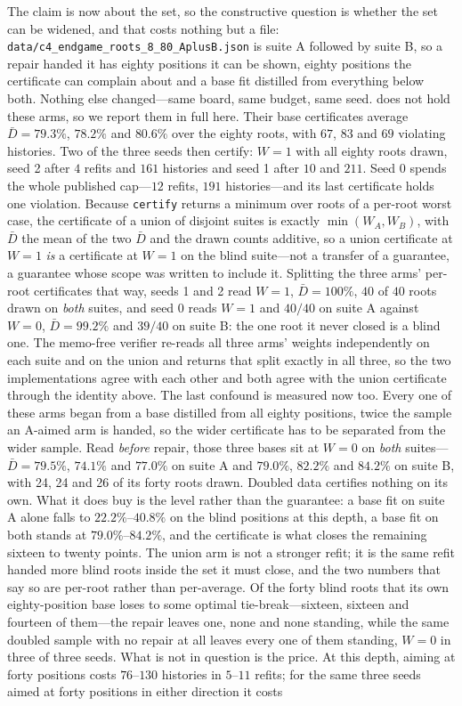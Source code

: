 \documentclass[conference]{IEEEtran}
\begin{document}
The claim is now about the set, so the constructive question is whether the set can be widened, and that costs nothing but a file: \texttt{data/c4\_endgame\_roots\_8\_80\_AplusB.json} is suite A followed by suite B, so a repair handed it has eighty positions it can be shown, eighty positions the certificate can complain about and a base fit distilled from everything below both. Nothing else changed---same board, same budget, same seed.  does not hold these arms, so we report them in full here. Their base certificates average $\bar D=79.3\%$, $78.2\%$ and $80.6\%$ over the eighty roots, with $67$, $83$ and $69$ violating histories. Two of the three seeds then certify: $W=1$ with all eighty roots drawn, seed 2 after $4$ refits and $161$ histories and seed 1 after $10$ and $211$. Seed 0 spends the whole published cap---$12$ refits, $191$ histories---and its last certificate holds one violation. Because \texttt{certify} returns a minimum over roots of a per-root worst case, the certificate of a union of disjoint suites is exactly $\min(W_A,W_B)$, with $\bar D$ the mean of the two $\bar D$ and the drawn counts additive, so a union certificate at $W=1$ \emph{is} a certificate at $W=1$ on the blind suite---not a transfer of a guarantee, a guarantee whose scope was written to include it. Splitting the three arms' per-root certificates that way, seeds 1 and 2 read $W=1$, $\bar D=100\%$, $40$ of $40$ roots drawn on \emph{both} suites, and seed 0 reads $W=1$ and $40/40$ on suite A against $W=0$, $\bar D=99.2\%$ and $39/40$ on suite B: the one root it never closed is a blind one. The memo-free verifier re-reads all three arms' weights independently on each suite and on the union and returns that split exactly in all three, so the two implementations agree with each other and both agree with the union certificate through the identity above. The last confound is measured now too. Every one of these arms began from a base distilled from all eighty positions, twice the sample an A-aimed arm is handed, so the wider certificate has to be separated from the wider sample. Read \emph{before} repair, those three bases sit at $W=0$ on \emph{both} suites---$\bar D=79.5\%$, $74.1\%$ and $77.0\%$ on suite A and $79.0\%$, $82.2\%$ and $84.2\%$ on suite B, with 24, 24 and 26 of its forty roots drawn. Doubled data certifies nothing on its own. What it does buy is the level rather than the guarantee: a base fit on suite A alone falls to $22.2\%$--$40.8\%$ on the blind positions at this depth, a base fit on both stands at $79.0\%$--$84.2\%$, and the certificate is what closes the remaining sixteen to twenty points. The union arm is not a stronger refit; it is the same refit handed more blind roots inside the set it must close, and the two numbers that say so are per-root rather than per-average. Of the forty blind roots that its own eighty-position base loses to some optimal tie-break---sixteen, sixteen and fourteen of them---the repair leaves one, none and none standing, while the same doubled sample with no repair at all leaves every one of them standing, $W=0$ in three of three seeds. What is not in question is the price. At this depth, aiming at forty positions costs $76$--$130$ histories in $5$--$11$ refits; for the same three seeds aimed at forty positions in either direction it costs 
\end{document}
